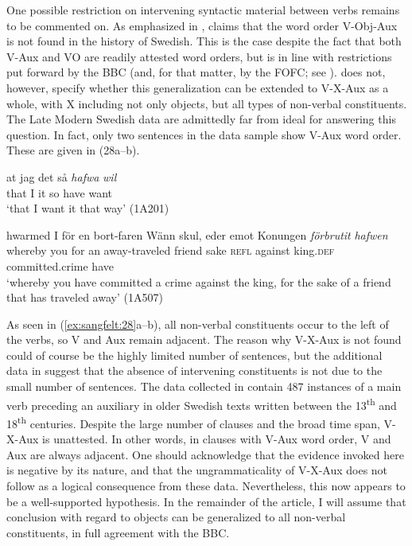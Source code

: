 \documentclass[output=paper, colorlinks, citecolor=brown]{langscibook}
\begin{document}
One possible restriction on intervening syntactic material between verbs remains to be commented on. As emphasized in , \citet[155, 159]{Petzell2011}  claims that the word order V-Obj-Aux is not found in the history of Swedish. This is the case despite the fact that both V-Aux and VO are readily attested word orders, but is in line with restrictions put forward by the BBC (and, for that matter, by the FOFC; see ). \citet{Petzell2011} does not, however, specify whether this generalization can be extended to V-X-Aux as a whole, with X including not only objects, but all types of non-verbal constituents. The Late Modern Swedish data are admittedly far from ideal for answering this question. In fact, only two sentences in the data sample show V-Aux word order. These are given in (28a–b).


\ea\label{ex:sangfelt:28}
\ea\label{ex:sangfelt:28a}
\gll at jag det så \textit{hafwa} \textit{wil} \\ %
 that I it so have want\\
\glt ‘that I want it that way’ (1A201)

\ex\label{ex:sangfelt:28b}
\gll hwarmed I {för} {en} {bort-faren} {Wänn} {skul,} {eder} {emot} {Konungen} \textit{förbrutit} \textit{hafwen}\\
 whereby you for an away-traveled friend sake \textsc{refl} against king.\textsc{def} committed.crime have\\
\glt ‘whereby you have committed a crime against the king, for the sake of a friend that has traveled away’ (1A507)
\z 
\z 


As seen in (\ref{ex:sangfelt:28}a–b), all non-verbal constituents occur to the left of the verbs, so V and Aux remain adjacent. The reason why V-X-Aux is not found could of course be the highly limited number of sentences, but the additional data in \citet{Sangfelt2019} suggest that the absence of intervening constituents is not due to the small number of sentences. The data collected in \citet[133]{Sangfelt2019} contain 487 instances of a main verb preceding an auxiliary in older Swedish texts written between the 13\textsuperscript{th} and 18\textsuperscript{th} centuries. Despite the large number of clauses and the broad time span, V-X-Aux is unattested. In other words, in clauses with V-Aux word order, V and Aux are always adjacent. One should acknowledge that the evidence invoked here is negative by its nature, and that the ungrammaticality of V-X-Aux does not follow as a logical consequence from these data. Nevertheless, this now appears to be a well-supported hypothesis. In the remainder of the article, I will assume that  conclusion with regard to objects can be generalized to all non-verbal constituents, in full agreement with the BBC.
\end{document}
